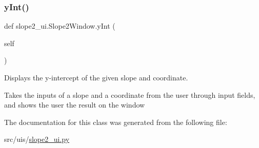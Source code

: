 \subsubsection{\texorpdfstring{y\+Int()}{yInt()}}
{\footnotesize\ttfamily def slope2\+\_\+ui.\+Slope2\+Window.\+y\+Int (\begin{DoxyParamCaption}\item[{}]{self }\end{DoxyParamCaption})}



Displays the y-\/intercept of the given slope and coordinate. 

Takes the inputs of a slope and a coordinate from the user through input fields, and shows the user the result on the window 

The documentation for this class was generated from the following file\+:\begin{DoxyCompactItemize}
\item 
src/uis/\hyperlink{slope2__ui_8py}{slope2\+\_\+ui.\+py}\end{DoxyCompactItemize}

